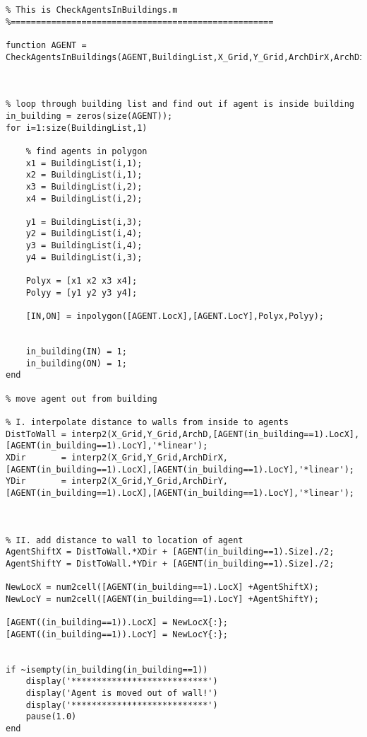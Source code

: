 \lstset{basicstyle=\footnotesize\ttfamily}
    
\begin{lstlisting}[breaklines]
%====================================================
% This is CheckAgentsInBuildings.m
%====================================================

function AGENT = CheckAgentsInBuildings(AGENT,BuildingList,X_Grid,Y_Grid,ArchDirX,ArchDirY,ArchD)



% loop through building list and find out if agent is inside building
in_building = zeros(size(AGENT));
for i=1:size(BuildingList,1)
    
    % find agents in polygon
    x1 = BuildingList(i,1);
    x2 = BuildingList(i,1);
    x3 = BuildingList(i,2);
    x4 = BuildingList(i,2);
    
    y1 = BuildingList(i,3);
    y2 = BuildingList(i,4);
    y3 = BuildingList(i,4);
    y4 = BuildingList(i,3);
    
    Polyx = [x1 x2 x3 x4];
    Polyy = [y1 y2 y3 y4];
    
    [IN,ON] = inpolygon([AGENT.LocX],[AGENT.LocY],Polyx,Polyy);
    
    
    in_building(IN) = 1;
    in_building(ON) = 1;
end

% move agent out from building

% I. interpolate distance to walls from inside to agents
DistToWall = interp2(X_Grid,Y_Grid,ArchD,[AGENT(in_building==1).LocX],[AGENT(in_building==1).LocY],'*linear');
XDir       = interp2(X_Grid,Y_Grid,ArchDirX,[AGENT(in_building==1).LocX],[AGENT(in_building==1).LocY],'*linear');
YDir       = interp2(X_Grid,Y_Grid,ArchDirY,[AGENT(in_building==1).LocX],[AGENT(in_building==1).LocY],'*linear');



% II. add distance to wall to location of agent
AgentShiftX = DistToWall.*XDir + [AGENT(in_building==1).Size]./2;
AgentShiftY = DistToWall.*YDir + [AGENT(in_building==1).Size]./2;

NewLocX = num2cell([AGENT(in_building==1).LocX] +AgentShiftX);
NewLocY = num2cell([AGENT(in_building==1).LocY] +AgentShiftY);

[AGENT((in_building==1)).LocX] = NewLocX{:};
[AGENT((in_building==1)).LocY] = NewLocY{:};


if ~isempty(in_building(in_building==1))
    display('***************************')
    display('Agent is moved out of wall!')
    display('***************************')
    pause(1.0)
end
\end{lstlisting}